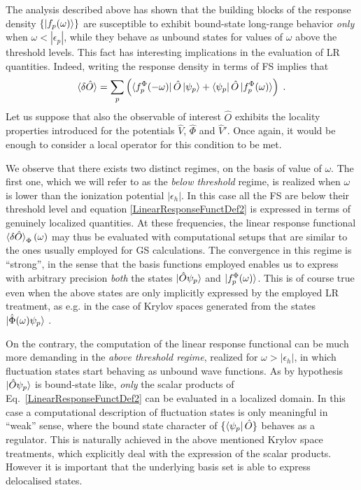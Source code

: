 \documentclass[reprint,aps,prb]{revtex4-1}
\newcommand{\eps}{\epsilon}
\newcommand{\be}{\begin{equation}}
\newcommand{\ee}{\end{equation}}
\newcommand{\lb}{\label}
\newcommand{\op}[1]{\hat {#1}}
\begin{document}
The analysis described above has shown that the building blocks of the response density $\{\ket{f_p(\omega)}\}$
are susceptible to exhibit bound-state long-range behavior \emph{only} when $\omega < |\eps_p|$,
while they behave as unbound states for values of $\omega$ above the threshold levels.
This fact has interesting implications in the evaluation of LR quantities. Indeed, writing the response
density in terms of FS implies that 
\be\lb{LinearResponseFunctDef2}
\braket{\delta\op O} = \sum_p \left( \bra{f_p^\Phi(-\omega)}\op O\ket{\psi_p}+ \bra{\psi_p}\op O\ket{f_p^\Phi(\omega)}\right) \;.
\ee
Let us suppose that also the observable of interest $\op O$ exhibits the locality properties introduced for the potentials $ \op V$, $\op \Phi$ and $\op V'$.
Once again, it would be enough to consider a local operator for this condition to be met.

We observe that there exists two
distinct regimes, on the basis of value of $\omega$.
The first one, which we will refer to as the \emph{below threshold} regime, is realized when
$\omega$ is lower than the ionization potential $|\eps_h|$.
In this case all the FS are below their threshold level and equation \eqref{LinearResponseFunctDef2}
is expressed in terms of genuinely localized
quantities. At these frequencies, the linear response functional $\braket{\delta\op O}_\Phi(\omega)$
may thus be evaluated with computational setups that
are similar to the ones usually employed for GS calculations.
The convergence in this regime is ``strong'', in the sense that the basis functions employed enables us to express
with arbitrary precision \emph{both} the states $\ket{\op O \psi_p}$ and $\ket{f_p^\Phi(\omega)}$.
This is of course true even when the above states are only implicitly expressed by the employed LR treatment,
 as e.g. in the case of Krylov spaces generated from the states $\ket{\op\Phi(\omega) \psi_p}$ \cite{baroni2006,baroni2008,linlinKPM}.

On the contrary, the computation of the linear response functional can be much more demanding in the \emph{above threshold regime}, realized for $\omega>|\eps_h|$, in which fluctuation
states start behaving as unbound wave functions.
As by hypothesis $\ket{\op O \psi_p}$ is bound-state like, \emph{only} the scalar products of Eq.~\eqref{LinearResponseFunctDef2} can be evaluated in a localized domain.
In this case a computational description of fluctuation states is only meaningful in ``weak'' sense,
where the bound state character of $\{\bra{\psi_p}\op O\}$ behaves as a regulator.
This is naturally achieved in the above mentioned Krylov space treatments, which
explicitly deal with the expression of the scalar products. However
it is important that the underlying basis set is able to express delocalised states.
\end{document}

